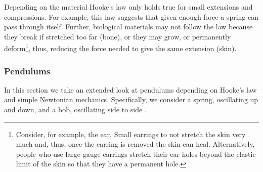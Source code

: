 \begin{itemize}
{Depending on the material Hooke's law only holds true for small extensions and compressions. For example, this law suggests that given enough force a spring can pass through itself. Further, biological materials may not follow the law because they break if stretched too far (\eg bone), or they may grow, or permanently deform\footnote{Consider, for example, the ear. Small earrings to not stretch the skin very much and, thus, once the earring is removed the skin can heal. Alternatively, people who use large gauge earrings stretch their ear holes beyond the elastic limit of the skin so that they have a permanent hole. }, thus, reducing the force needed to give the same extension (\eg skin).
}

\end{itemize}
\subsubsection{Pendulums}\label{Pendulums_section}
In this section we take an extended look at pendulums depending on Hooke's law and simple Newtonian mechanics. Specifically, we consider a spring, oscillating up and down, and a bob, oscillating side to side .
